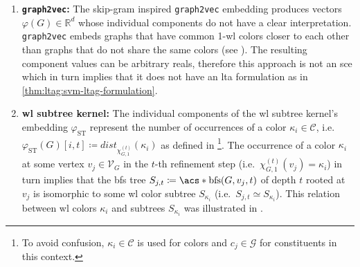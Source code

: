 \begin{enumerate}[label=\textbf{\arabic*.},ref={\arabic*}]
		Under the assumption that the substructure patterns $S_i$ are chosen s.t.\ the their instances $c \in \psi_{\mathrm{FP}, i}(G)$ are nontrivial interpretable constituents, the underlying joint decomposition $\psi_{\mathrm{FP}}(G) \coloneqq \bigcup_{i=1}^d \psi_{\mathrm{FP}, i}(G)$ must also be nontrivial and interpretable.
		Thus, by \cref{thm:ltag:svm-ltag-formulation}, \acp{svm} trained on fingerprint embeddings are \ac{lta} models that produce locally explainable predictions.
	\item \textbf{\texttt{graph2vec}:}
		The skip-gram inspired \texttt{graph2vec} embedding produces vectors $\varphi(G) \in \mathbb{R}^d$ whose individual components do not have a clear interpretation.
		\texttt{graph2vec} embeds graphs that have common 1-\acs{wl} colors closer to each other than graphs that do not share the same colors (see ).
		The resulting component values can be arbitrary reals, therefore this approach is not an \ac{sce} which in turn implies that it does not have an \ac{lta} formulation as in \cref{thm:ltag:svm-ltag-formulation}.
	\item \textbf{\ac{wl} subtree kernel:}\label{itm:ltag:wlst-lta-formulation}
		The individual components of the \ac{wl} subtree kernel's embedding $\varphi_{\mathrm{ST}}$ represent the number of occurrences of a color $\kappa_i \in \mathcal{C}$, i.e.\ $\varphi_{\mathrm{ST}}(G)[i, t] \coloneqq \mathit{dist}_{\chi_{G,1}^{(t)}}(\kappa_i)$ as defined in \footnote{
			To avoid confusion, $\kappa_i \in \mathcal{C}$ is used for colors and $c_j \in \mathcal{G}$ for constituents in this context.
		}.
		The occurrence of a color $\kappa_i$ at some vertex $v_j \in \mathcal{V}_G$ in the $t$-th refinement step (i.e.\ $\chi_{G,1}^{(t)}(v_j) = \kappa_i$) in turn implies that the \ac{bfs} tree $S_{j,t} \coloneqq \mathrm{\acs*{bfs}}(G, v_j, t)$ of depth $t$ rooted at $v_j$ is isomorphic to some \ac{wl} color subtree $S_{\kappa_i}$ (i.e.\ $S_{j,t} \simeq S_{\kappa_i}$).
		This relation between \ac{wl} colors $\kappa_i$ and subtrees $S_{\kappa_i}$ was illustrated in .


\end{enumerate}
